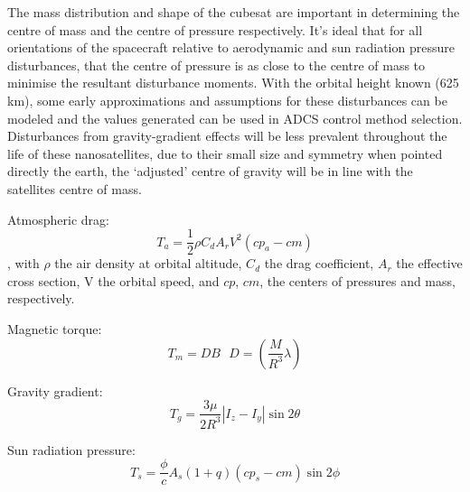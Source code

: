 The mass distribution and shape of the cubesat are important in determining the
centre of mass and the centre of pressure respectively. It’s ideal that for
all orientations of the spacecraft relative to aerodynamic and sun radiation
pressure disturbances, that the centre of pressure is as close to the centre
of mass to minimise the resultant disturbance moments. With the orbital height
known (625 km), some early approximations and assumptions for these disturbances
can be modeled and the values generated can be used in ADCS control method
selection. Disturbances from gravity-gradient effects will be less prevalent
throughout the life of these nanosatellites, due to their small size and symmetry
when pointed directly the earth, the ‘adjusted’ centre of gravity will be in line
with the satellites centre of mass.

Atmospheric drag:
\begin{equation}
	T_a = \frac{1}{2} \rho C_d A_r V^2 (cp_a - cm)
\end{equation}
, with $\rho$ the air density at orbital altitude, $C_d$ the drag coefficient,
$A_r$ the effective cross section, V the orbital speed, and $cp$, $cm$, the centers
of pressures and mass, respectively.

Magnetic torque:
\begin{equation}
	T_m = DB ~~~ D = \left(\frac{M}{R^3} \lambda \right)
\end{equation}

Gravity gradient:
\begin{equation}
	T_g = \frac{3\mu}{2R^3}\left|I_z - I_y\right| \sin2\theta
\end{equation}


Sun radiation pressure:
\begin{equation}
	T_s = \frac{\phi}{c} A_s (1+q) (cp_s - cm) \sin 2\phi
\end{equation}
